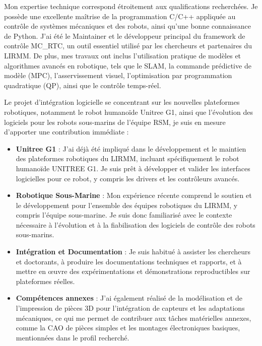 \documentclass[11pt, a4paper]{awesome-cv}
\begin{document}
\begin{cvletter}
  Mon expertise technique correspond étroitement aux qualifications recherchées. Je possède une excellente
  maîtrise de la programmation C/C++ appliquée au contrôle de systèmes mécaniques et des robots, ainsi qu'une
  bonne connaissance de Python. J'ai été le Maintainer et le développeur principal du framework de contrôle
  MC\_RTC, un outil essentiel utilisé par les chercheurs et partenaires du LIRMM. De plus, mes travaux ont
  inclus l’utilisation pratique de modèles et algorithmes avancés en robotique, tels que le SLAM, la commande
  prédictive de modèle (MPC), l’asservissement visuel, l’optimisation par programmation quadratique (QP),
  ainsi que le contrôle temps-réel.

  Le projet d’intégration logicielle se concentrant sur les nouvelles plateformes robotiques, notamment le
  robot humanoïde Unitree G1, ainsi que l'évolution des logiciels pour les robots sous-marins de l'équipe
  RSM, je suis en mesure d'apporter une contribution immédiate :
  \begin{itemize}
    \item \textbf{Unitree G1} : J'ai déjà été impliqué dans le développement et le maintien des plateformes
      robotiques du LIRMM, incluant spécifiquement le robot humanoïde UNITREE G1. Je suis prêt à développer
      et valider les interfaces logicielles pour ce robot, y compris les drivers et les contrôleurs avancés.
    \item \textbf{Robotique Sous-Marine} : Mon expérience récente comprend le soutien et le développement
      pour l'ensemble des équipes robotiques du LIRMM, y compris l'équipe sous-marine. Je suis donc
      familiarisé avec le contexte nécessaire à l'évolution et à la fiabilisation des logiciels de contrôle
      des robots sous-marins.
    \item \textbf{Intégration et Documentation} : Je suis habitué à assister les chercheurs et doctorants, à
      produire les documentations techniques et rapports, et à mettre en œuvre des expérimentations et
      démonstrations reproductibles sur plateformes réelles.
    \item \textbf{Compétences annexes} : J'ai également réalisé de la modélisation et de l'impression de
      pièces 3D pour l'intégration de capteurs et les adaptations mécaniques, ce qui me permet de contribuer
      aux tâches matérielles annexes, comme la CAO de pièces simples et les montages électroniques basiques,
      mentionnées dans le profil recherché.
  \end{itemize}


\end{cvletter}
\end{document}
